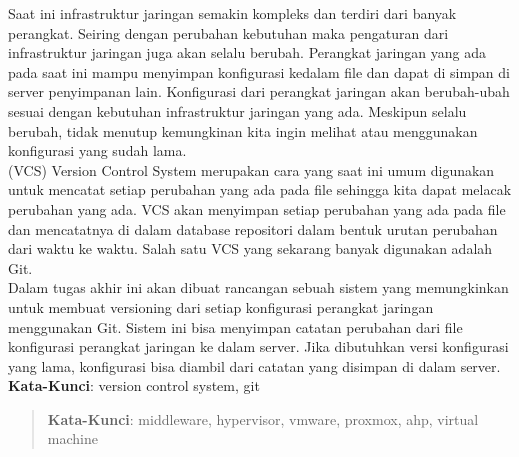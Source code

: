 \begin{abstrak}
        Saat ini infrastruktur jaringan semakin kompleks dan terdiri dari banyak perangkat. Seiring dengan perubahan kebutuhan maka pengaturan dari infrastruktur jaringan juga akan selalu berubah. Perangkat jaringan yang ada pada saat ini mampu menyimpan konfigurasi kedalam file dan dapat di simpan di server penyimpanan lain. Konfigurasi dari perangkat jaringan akan berubah-ubah sesuai dengan kebutuhan infrastruktur jaringan yang ada. Meskipun selalu berubah, tidak menutup kemungkinan kita ingin melihat atau menggunakan konfigurasi yang sudah lama.\\
		\indent (VCS) Version Control System  merupakan cara yang saat ini umum digunakan untuk mencatat setiap perubahan yang ada pada file sehingga kita dapat melacak perubahan yang ada. VCS akan menyimpan setiap perubahan yang ada pada file dan mencatatnya di dalam database repositori dalam bentuk urutan perubahan dari waktu ke waktu. Salah satu VCS yang sekarang banyak digunakan adalah Git.\\
		\indent Dalam tugas akhir ini akan dibuat rancangan sebuah sistem yang memungkinkan untuk membuat versioning dari setiap konfigurasi perangkat jaringan menggunakan Git. Sistem ini bisa menyimpan catatan perubahan dari file konfigurasi perangkat jaringan ke dalam server. Jika dibutuhkan versi konfigurasi yang lama, konfigurasi bisa diambil dari catatan yang disimpan di dalam server.\\

	\noindent \textbf{Kata-Kunci}: version control system, git
\end{abstrak}
\newpage
\begin{abstract}
	

	\noindent \textbf{Kata-Kunci}: middleware, hypervisor, vmware, proxmox, ahp, virtual machine
\end{abstract}
